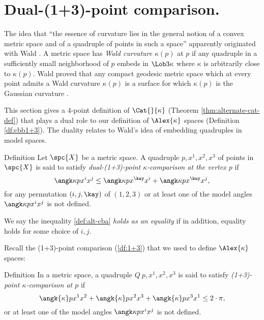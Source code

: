
\section{Dual-(1+3)-point comparison.}\label{sec:dual-1+3}



The idea that ``the essence of curvature lies in the general notion of a convex metric space and of a quadruple of points in such a space'' apparently originated with Wald \cite[p.17]{menger:wald}. A metric space has \emph{Wald curvature} $\kappa(p)$ at $p$  if  any quadruple in a sufficiently small neighborhood of $p$ embeds in $\Lob3\kappa$ where $\kappa$ is arbitrarily close to $\kappa(p)$.  Wald proved that any compact geodesic metric space which at every point admits a Wald curvature $\kappa(p)$ is a surface for which $\kappa(p)$ is the Gaussian curvature \cite{wald}. %
  
This section gives a $4$-point definition of  $\Cat{}{\kappa}$ (Theorem \ref{thm:alternate-cat-def}) that plays a dual role to our definition of $\Alex{\kappa}$ spaces (Definition \ref{df:cbb1+3}).  
The duality relates to Wald's idea of embedding quadruples in model spaces. 


\begin{thm}{Definition}\label{def:alt-cba}
Let $\spc{X}$ be a metric space.
A quadruple $p,x^1,x^2,x^3$ of points in $\spc{X}$ 
is said to satisfy \emph{dual-(1+3)-point $\kappa$-comparison at the vertex $p$} if
\[
\angk\kappa p{x^i}{x^j}\le \angk\kappa p{x^\kay}{x^i} + \angk\kappa p{x^\kay}{x^j}, 
\]
for any permutation $(i,j,\kay)$ of $(1,2,3)$
or at least one of the model angles $\angk\kappa p{x^i}{x^j}$  is not defined.
\end{thm}

We say the inequality \ref{def:alt-cba} \emph{holds as an equality} if in addition, equality holds for some choice of $i,j$.

Recall the (1+3)-point comparison (\ref{df:1+3}) that we used to define $\Alex{\kappa}$ spaces:

\begin{thm}{Definition}\label{def:cbb} 
In a metric space, a quadruple $Q\:p,x^1,x^2,x^3$ is said to satisfy \emph{(1+3)-point $\kappa$-comparison at   $p$} if 
\[\angk{\kappa} p{x^1}{x^2}+\angk{\kappa} p{x^2}{x^3}+\angk{\kappa}p{x^3}{x^1}\le 2\cdot \pi,
\]
or at least one of the model angles $\angk\kappa p{x^i}{x^j}$  is not defined.
\end{thm}

